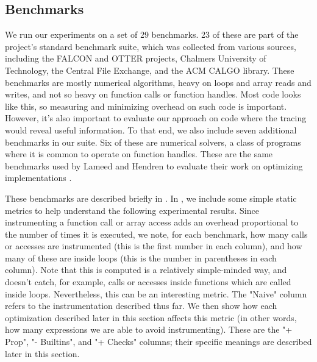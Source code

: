 \subsection{Benchmarks}

We run our experiments on a set of 29 \matlab benchmarks. 23 of these are part
of the \mclab project's standard benchmark suite, which was collected from
various sources, including the FALCON and OTTER projects, Chalmers University
of Technology, the \matlab Central File Exchange, and the ACM CALGO library.
These benchmarks are mostly numerical algorithms, heavy on loops and array
reads and writes, and not so heavy on function calls or function handles. Most
\matlab code looks like this, so measuring and minimizing overhead on such code
is important. However, it's also important to evaluate our approach on code
where the tracing would reveal useful information. To that end, we also include
seven additional benchmarks in our suite. Six of these are numerical solvers, a
class of programs where it is common to operate on function handles. These are
the same benchmarks used by Lameed and Hendren to evaluate their work on
optimizing  implementations \cite{OptimizingFeval}.

These benchmarks are described briefly in
. In
, we include some simple
static metrics to help understand the following experimental results. Since
instrumenting a function call or array access adds an overhead proportional to
the number of times it is executed, we note, for each benchmark, how many calls
or accesses are instrumented (this is the first number in each column), and how
many of these are inside loops (this is the number in parentheses in each
column). Note that this is computed is a relatively simple-minded way, and
doesn't catch, for example, calls or accesses inside functions which are called
inside loops. Nevertheless, this can be an interesting metric. The "Naive"
column refers to the instrumentation described thus far. We then show how each
optimization described later in this section affects this metric (in other
words, how many expressions we are able to avoid instrumenting). These are the
"+ Prop", "- Builtins", and "+ Checks" columns; their specific meanings are
described later in this section.

